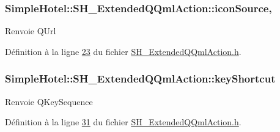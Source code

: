 \hypertarget{classSimpleHotel_1_1SH__ExtendedQQmlAction_aa433667cea05e90667ff9753cd5b543c}{
\subsubsection[{icon\-Source}]{\setlength{\rightskip}{0pt plus 5cm}Simple\-Hotel\-::\-S\-H\-\_\-\-Extended\-Q\-Qml\-Action\-::icon\-Source\hspace{0.3cm}{\ttfamily [read]}, {\ttfamily [write]}}}\label{classSimpleHotel_1_1SH__ExtendedQQmlAction_aa433667cea05e90667ff9753cd5b543c}
\begin{DoxyReturn}{Renvoie}
Q\-Url 
\end{DoxyReturn}


Définition à la ligne \hyperlink{SH__ExtendedQQmlAction_8h_source_l00023}{23} du fichier \hyperlink{SH__ExtendedQQmlAction_8h_source}{S\-H\-\_\-\-Extended\-Q\-Qml\-Action.\-h}.

\hypertarget{classSimpleHotel_1_1SH__ExtendedQQmlAction_ac10d4f8f86d394f39d38f4ebdd375e62}{
\subsubsection[{key\-Shortcut}]{\setlength{\rightskip}{0pt plus 5cm}Simple\-Hotel\-::\-S\-H\-\_\-\-Extended\-Q\-Qml\-Action\-::key\-Shortcut\hspace{0.3cm}{\ttfamily [write]}}}\label{classSimpleHotel_1_1SH__ExtendedQQmlAction_ac10d4f8f86d394f39d38f4ebdd375e62}
\begin{DoxyReturn}{Renvoie}
Q\-Key\-Sequence 
\end{DoxyReturn}


Définition à la ligne \hyperlink{SH__ExtendedQQmlAction_8h_source_l00031}{31} du fichier \hyperlink{SH__ExtendedQQmlAction_8h_source}{S\-H\-\_\-\-Extended\-Q\-Qml\-Action.\-h}.

